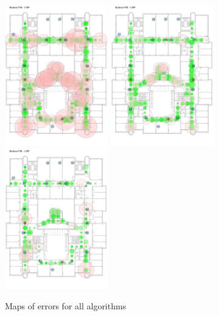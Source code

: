 \begin{figure}[h!]
	\begin{centering}
		\includegraphics[width=0.4\textwidth]{img/combined_error_classic}
		\includegraphics[width=0.4\textwidth]{img/combined_error_multiple_f}
		\includegraphics[width=0.4\textwidth]{img/combined_error_f_combination}
		\par\end{centering}
	\caption{Maps of errors for all algorithms}
	\label{fig09c06}
\end{figure}

